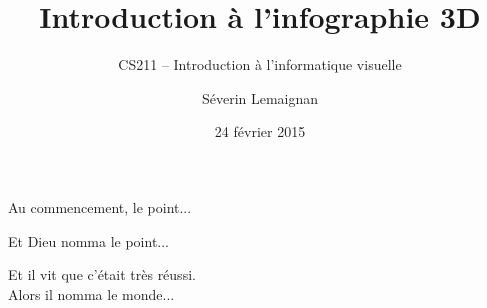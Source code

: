 \documentclass[compress]{beamer}
\title{Introduction à l'infographie 3D}
\subtitle{CS211 -- Introduction à l'informatique visuelle}
\date{24 février 2015}
\author{Séverin Lemaignan}
\institute{Computer-Human Interaction\\for Learning and Instruction {\Medium
EPFL}}
\begin{document}
\maketitle

\begin{frame}{Au commencement, le point...}
    \begin{center}


    \end{center}


\end{frame}


\begin{frame}{}
    \begin{center}
        Et Dieu nomma le point...\\[1em]
    \end{center}

\end{frame}

\begin{frame}{}
    \begin{center}
        Et il vit que c'était très réussi.\\[1em]

        Alors il nomma le monde...\\[1em]

    \end{center}

\end{frame}
\end{document}
